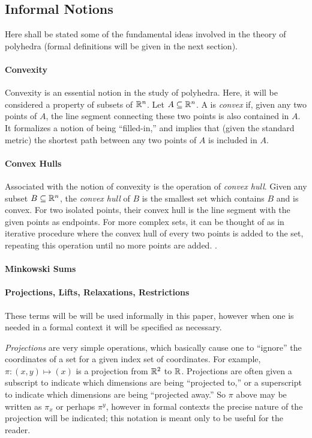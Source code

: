 
\subsection{Informal Notions}

Here shall be stated some of the fundamental ideas involved in the theory of polyhedra (formal definitions will be given in the next section).

\paragraph{Convexity} Convexity is an essential notion in the study of polyhedra.  Here, it will be considered a property of subsets of $\mathbb{R}^n$.  Let $A \subseteq \mathbb{R}^n$.  A is \textit{convex} if, given any two points of $A$, the line segment connecting these two points is also contained in $A$.  It formalizes a notion of being ``filled-in,'' and implies that (given the standard metric) the shortest path between any two points of $A$ is included in $A$.  

\paragraph{Convex Hulls} Associated with the notion of convexity is the operation of \textit{convex hull}.  Given any subset $B \subseteq \mathbb{R}^n$, the \textit{convex hull} of $B$ is the smallest set which contains $B$ and is convex.  For two isolated points, their convex hull is the line segment with the given points as endpoints.  For more complex sets, it can be thought of as in iterative procedure where the convex hull of every two points is added to the set, repeating this operation until no more points are added. .

\paragraph{Minkowski Sums}

\paragraph{Projections, Lifts, Relaxations, Restrictions}  These terms will be will be used informally in this paper, however when one is needed in a formal context it will be specified as necessary.  

\textit{Projections} are very simple operations, which basically cause one to ``ignore'' the coordinates of a set for a given index set of coordinates.  For example, $\pi: (x,y) \mapsto (x)$ is a projection from $\mathbb{R}^2$ to $\mathbb{R}$.  Projections are often given a subscript to indicate which dimensions are being ``projected to,'' or a superscript to indicate which dimensions are being ``projected away.''  So $\pi$ above may be written as $\pi_x$ or perhaps $\pi^y$, however in formal contexts the precise nature of the projection will be indicated; this notation is meant only to be useful for the reader.

